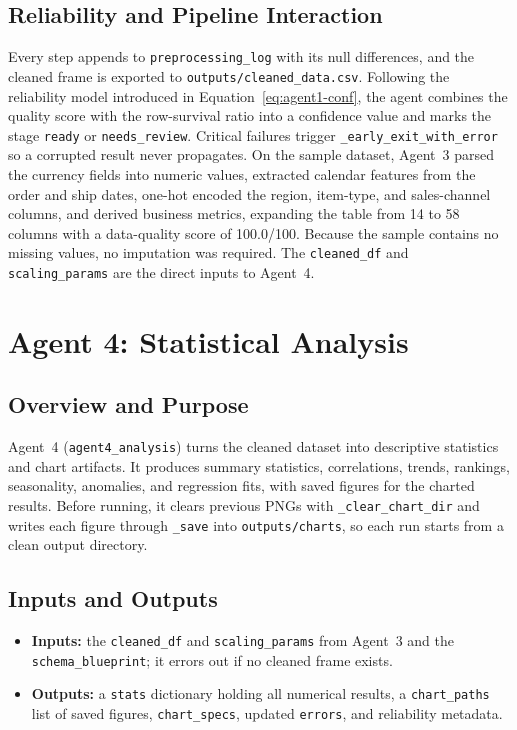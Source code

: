 \documentclass[12pt,a4paper,openany]{report}
\begin{document}
\subsection{Reliability and Pipeline Interaction}
Every step appends to \texttt{preprocessing\_log} with its null differences, and the cleaned frame is exported to \texttt{outputs/cleaned\_data.csv}. Following the reliability model introduced in Equation~\ref{eq:agent1-conf}, the agent combines the quality score with the row-survival ratio into a confidence value and marks the stage \texttt{ready} or \texttt{needs\_review}. Critical failures trigger \texttt{\_early\_exit\_with\_error} so a corrupted result never propagates. On the sample dataset, Agent~3 parsed the currency fields into numeric values, extracted calendar features from the order and ship dates, one-hot encoded the region, item-type, and sales-channel columns, and derived business metrics, expanding the table from 14 to 58 columns with a data-quality score of 100.0/100. Because the sample contains no missing values, no imputation was required. The \texttt{cleaned\_df} and \texttt{scaling\_params} are the direct inputs to Agent~4.

\section{Agent 4: Statistical Analysis}

\subsection{Overview and Purpose}
Agent~4 (\texttt{agent4\_analysis}) turns the cleaned dataset into descriptive statistics and chart artifacts. It produces summary statistics, correlations, trends, rankings, seasonality, anomalies, and regression fits, with saved figures for the charted results. Before running, it clears previous PNGs with \texttt{\_clear\_chart\_dir} and writes each figure through \texttt{\_save} into \texttt{outputs/charts}, so each run starts from a clean output directory.

\subsection{Inputs and Outputs}
\begin{itemize}
	\item \textbf{Inputs:} the \texttt{cleaned\_df} and \texttt{scaling\_params} from Agent~3 and the \texttt{schema\_blueprint}; it errors out if no cleaned frame exists.
	\item \textbf{Outputs:} a \texttt{stats} dictionary holding all numerical results, a \texttt{chart\_paths} list of saved figures, \texttt{chart\_specs}, updated \texttt{errors}, and reliability metadata.
\end{itemize}
\end{document}
